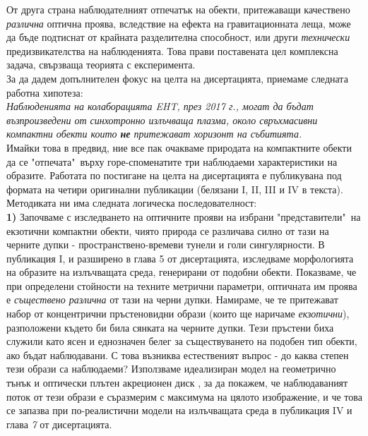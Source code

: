 \documentclass[12pt]{article}
\numberwithin{equation}{section}
\numberwithin{figure}{section}
\begin{document}
	\noindent От друга страна наблюдателният отпечатък на обекти, притежаващи качествено \emph{различна} оптична проява, вследствие на ефекта на гравитационната леща, може да бъде подтиснат от крайната разделителна способност, или други \emph{технически} предизвикателства на наблюденията. Това прави поставената цел комплексна задача, свързваща теорията с експеримента.\\
	
	\noindent За да дадем допълнителен фокус на целта на дисертацията, приемаме следната работна хипотеза:\\
	
	\emph{Наблюденията на колаборацията EHT, през 2017 г., могат да бъдат възпроизведени от синхотронно излъчваща плазма, около свръхмасивни компактни обекти които \textbf{не} притежават хоризонт на събитията.}\\
	
	\noindent Имайки това в предвид, ние все пак очакваме природата на компактните обекти да се "отпечата"$\,$ върху горе-споменатите три наблюдаеми характеристики на образите. Работата по постигане на целта на дисертацията е публикувана под формата на четири оригинални публикации (белязани I, II, III и IV в текста). Методиката ни има следната логическа последователност:\\
	
	\textbf{1)} Започваме с изследването на оптичните прояви на избрани "представители"$\,$ на екзотични компактни обекти, чиято природа се различава силно от тази на черните дупки - пространствено-времеви тунели и голи сингулярности. В публикация I, и разширено в глава 5 от дисертацията, изследваме морфологията на образите на излъчващата среда, генерирани от подобни обекти. Показваме, че при определени стойности на техните метрични параметри, оптичната им проява е \emph{съществено различна} от тази на черни дупки. Намираме, че те притежават набор от концентрични пръстеновидни образи (които ще наричаме \emph{екзотични}), разположени където би била сянката на черните дупки. Тези пръстени биха служили като ясен и еднозначен белег за съществуването на подобен тип обекти, ако бъдат наблюдавани. С това възниква естественият въпрос - до каква степен тези образи са наблюдаеми? Използваме идеализиран модел на геометрично тънък и оптически плътен акреционен диск \cite{Page1973}, за да покажем, че наблюдаваният поток от тези образи е съразмерим с максимума на цялото изображение, и че това се запазва при по-реалистични модели на излъчващата среда в публикация IV и глава \emph{7} от дисертацията.\\
	
\end{document}
